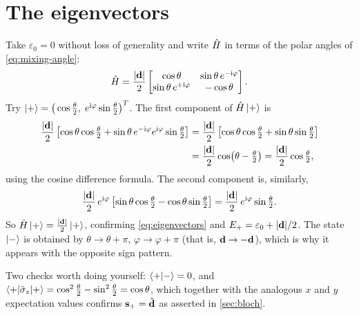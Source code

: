 \section{The eigenvectors}
\label{app:eigvec}

Take $\varepsilon_0=0$ without loss of generality and write $\hat{H}$ in terms of the polar
angles of \cref{eq:mixing-angle}:
%
\begin{equation}
\hat{H} = \frac{|\mathbf{d}|}{2}
\begin{bmatrix}
\cos\theta & \sin\theta\,e^{-\mathrm{i}\varphi}\\
\sin\theta\,e^{+\mathrm{i}\varphi} & -\cos\theta
\end{bmatrix}.
\end{equation}
%
Try $\ket{+} = \big(\cos\tfrac{\theta}{2},\; e^{\mathrm{i}\varphi}\sin\tfrac{\theta}{2}\big)^{T}$.
The first component of $\hat{H}\ket{+}$ is
%
\begin{align}
\frac{|\mathbf{d}|}{2}\left[\cos\theta\cos\tfrac{\theta}{2}
 + \sin\theta\,e^{-\mathrm{i}\varphi}e^{\mathrm{i}\varphi}\sin\tfrac{\theta}{2}\right]
&= \frac{|\mathbf{d}|}{2}\left[\cos\theta\cos\tfrac{\theta}{2} + \sin\theta\sin\tfrac{\theta}{2}\right] \nonumber\\
&= \frac{|\mathbf{d}|}{2}\cos\!\left(\theta-\tfrac{\theta}{2}\right)
 = \frac{|\mathbf{d}|}{2}\cos\tfrac{\theta}{2},
\end{align}
%
using the cosine difference formula. The second component is, similarly,
%
\begin{equation}
\frac{|\mathbf{d}|}{2}\,e^{\mathrm{i}\varphi}\left[\sin\theta\cos\tfrac{\theta}{2} - \cos\theta\sin\tfrac{\theta}{2}\right]
= \frac{|\mathbf{d}|}{2}\,e^{\mathrm{i}\varphi}\sin\tfrac{\theta}{2}.
\end{equation}
%
So $\hat{H}\ket{+} = \tfrac{|\mathbf{d}|}{2}\ket{+}$, confirming \cref{eq:eigenvectors} and
$E_+ = \varepsilon_0 + |\mathbf{d}|/2$. The state $\ket{-}$ is obtained by
$\theta\to\theta+\pi$, $\varphi\to\varphi+\pi$ (that is, $\mathbf{d}\to-\mathbf{d}$), which is why
it appears with the opposite sign pattern.

Two checks worth doing yourself: $\braket{+|-} = 0$, and
$\braket{+|\hat{\sigma}_z|+} = \cos^2\tfrac{\theta}{2}-\sin^2\tfrac{\theta}{2} = \cos\theta$, which
together with the analogous $x$ and $y$ expectation values confirms
$\mathbf{s}_+ = \hat{\mathbf{d}}$ as asserted in \cref{sec:bloch}.

